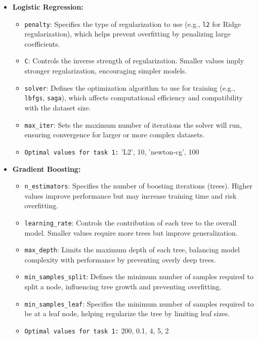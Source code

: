 \documentclass{article}
\begin{document}
\begin{itemize}
    \item \textbf{Logistic Regression:}
    \begin{itemize}
        \item \texttt{penalty}: Specifies the type of regularization to use (e.g., \texttt{l2} for Ridge regularization), which helps prevent overfitting by penalizing large coefficients.
        \item \texttt{C}: Controls the inverse strength of regularization. Smaller values imply stronger regularization, encouraging simpler models.
        \item \texttt{solver}: Defines the optimization algorithm to use for training (e.g., \texttt{lbfgs}, \texttt{saga}), which affects computational efficiency and compatibility with the dataset size.
        \item \texttt{max\_iter}: Sets the maximum number of iterations the solver will run, ensuring convergence for larger or more complex datasets.
        \item \texttt{Optimal values for task 1:} 'L2', 10, 'newton-cg', 100
    \end{itemize}

    \item \textbf{Gradient Boosting:}
    \begin{itemize}
        \item \texttt{n\_estimators}: Specifies the number of boosting iterations (trees). Higher values improve performance but may increase training time and risk overfitting.
        \item \texttt{learning\_rate}: Controls the contribution of each tree to the overall model. Smaller values require more trees but improve generalization.
        \item \texttt{max\_depth}: Limits the maximum depth of each tree, balancing model complexity with performance by preventing overly deep trees.
        \item \texttt{min\_samples\_split}: Defines the minimum number of samples required to split a node, influencing tree growth and preventing overfitting.
        \item \texttt{min\_samples\_leaf}: Specifies the minimum number of samples required to be at a leaf node, helping regularize the tree by limiting leaf sizes.
        \item \texttt{Optimal values for task 1:} 200, 0.1, 4, 5, 2
    \end{itemize}


\end{itemize}
\end{document}
